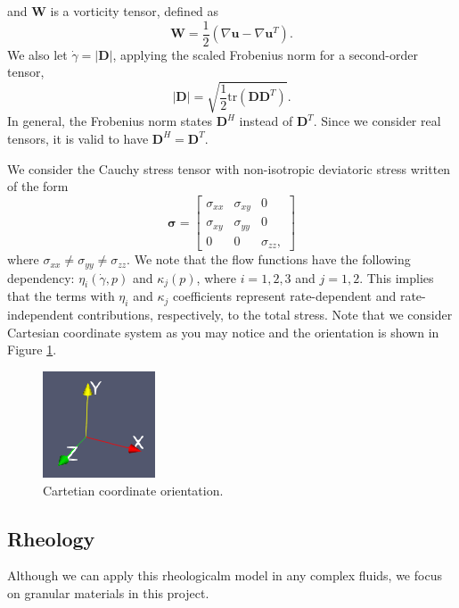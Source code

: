 and ${\bm W}$ is a vorticity tensor, defined as 
\[
	{\bm W} = \frac{1}{2}\left( \nabla {\bm u} - \nabla {\bm u}^{T}\right).
\]
We also let $\dot{\gamma} = \left| {\bm D} \right|$, applying the scaled Frobenius norm for a second-order tensor, 
\[
    |\bm{D}| = \sqrt{\frac{1}{2}
    \text{tr}\left(\bm{D} \bm{D}^{T} \right)}.
\]
In general, the Frobenius norm states $\bm{D}^H$ instead of $\bm{D}^T$. Since we consider real tensors, it is valid to have $\bm{D}^H = \bm{D}^T$. 
\par 
We consider the Cauchy stress tensor with non-isotropic deviatoric stress written of the form 
\[{\bm \sigma} = 
  \begin{bmatrix}
    \sigma_{xx} & \sigma_{xy} & 0 
    \\
    \sigma_{xy} & \sigma_{yy} & 0 
    \\
    0 & 0 & \sigma_{zz},
  \end{bmatrix}
\] 
where $\sigma_{xx} \neq \sigma_{yy} \neq \sigma_{zz}$.
We note that the flow functions have the following dependency: $\eta_i(\dot{\gamma}, p)$ and $\kappa_j (p)$, where $i = 1,2,3$ and $j = 1,2$. 
This implies that the terms with $\eta_i$ and $\kappa_j$ coefficients represent rate-dependent and rate-independent contributions, respectively, to the total stress.
%
Note that we consider Cartesian coordinate system as you may notice and the orientation is shown in Figure \ref{fig_orientation}.
\\
\vphantom{dX}
    \begin{figure}[ht]
      \begin{center}
        \includegraphics[scale=0.8]{figures/fig_orientation.png}
      \caption{Cartetian coordinate orientation.}
      \label{fig_orientation}
      \end{center}
    \end{figure}
\subsection{Rheology}
Although we can apply this rheologicalm model in any complex fluids, we focus on granular materials in this project. 

